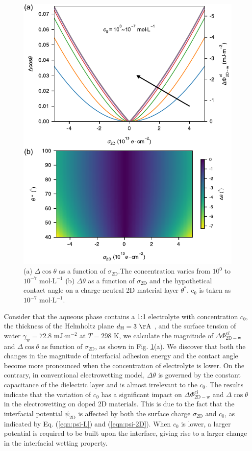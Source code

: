 \documentclass[journal=ancac3,manuscript=article,email=true]{achemso}
\begin{document}
\begin{figure}[htbp]
\centering
\includegraphics[width=0.85\linewidth]{../img/2d-ph-dependency.pdf}
\caption{\label{fig:Delta-cos-dependency}
(a) \(\Delta\cos\theta\) as a function of \(\sigma_{\mathrm{2D}}\).The concentration varies from \(10^{0}\) to \(10^{-7}\) mol\(\cdot\mathrm{L}^{-1}\) (b) \(\Delta\theta\) as a function of \(\sigma_{\mathrm{2D}}\) and the hypothetical contact angle on a charge-neutral 2D material layer \(\theta^{*}\). c\(_{\text{0}}\) is taken as \(10^{-7}\) mol\(\cdot\mathrm{L}^{-1}\).}
\end{figure}

Consider that the aqueous phase contains a 1:1 electrolyte with
concentration \(c_{0}\), the thickness of the Helmholtz plane
\(d_{\mathrm{H}}=3\ \mathrm{\AA}\) \cite{mcclendon_thickness_1927}, and
the surface tension of water \(\gamma_{\mathrm{w}}=72.8\) mJ\(\cdot
\mathrm{m}^{-2}\) at \(T=298\) K, we calculate the magnitude of
\(\Delta\Phi_{\mathrm{2D-w}}^{el}\) and \(\Delta\cos\theta\) as function
of \(\sigma_{\mathrm{2D}}\), as shown in
Fig. \ref{fig:Delta-cos-dependency}(a). We discover that both the
changes in the magnitude of interfacial adhesion energy and the
contact angle become more pronounced when the concentration of
electrolyte is lower. On the contrary, in conventional electrowetting
model, \(\Delta\theta\) is governed by the constant capacitance of the
dielectric layer and is almost irrelevant to the \(c_{0}\). The results indicate that the variation of \(c_{0}\) has a significant impact on \(\Delta
\Phi_{\mathrm{2D-w}}^{el}\) and \(\Delta \cos \theta\) in the
electrowetting on doped 2D materials. This is due to the fact that the
interfacial potential \(\psi_{\mathrm{2D}}\) is affected by both the
surface charge \(\sigma_{\mathrm{2D}}\) and \(c_{0}\), as indicated by
Eq. (\ref{eqn:psi-L}) and (\ref{eqn:psi-2D}). When \(c_{0}\) is lower, a
larger potential is required to be built upon the interface, giving
rise to a larger change in the interfacial wetting property.
\end{document}
